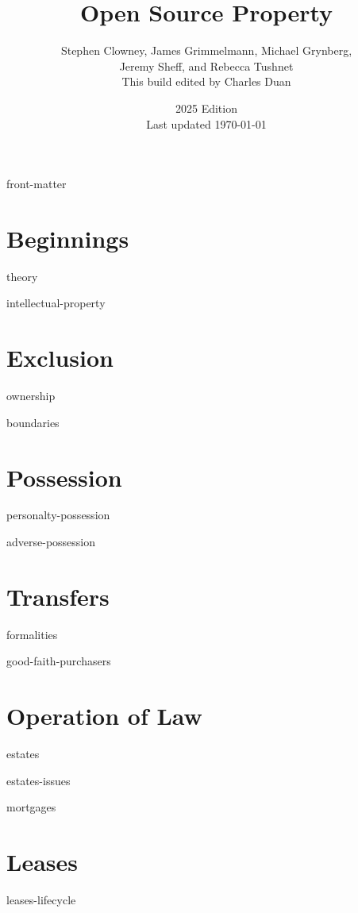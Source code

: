 \documentclass[12pt]{book}
\title{Open Source Property}
\author{Stephen Clowney, James Grimmelmann, Michael Grynberg,\\
Jeremy Sheff, and Rebecca Tushnet \\[12pt]
This build edited by Charles Duan}
\date{2025 Edition \\ Last updated \today}
\begin{document}
\sloppy
\raggedbottom
\frenchspacing
{}                                                
\parskip=0pt                                                  



\makevolume

\tableofcontents

\module front-matter

\mainmatter

\part{Beginnings}

\module theory

\module intellectual-property

\part{Exclusion}

\module ownership

\module boundaries

\part{Possession}

\module personalty-possession

\module adverse-possession


\part{Transfers}

\module formalities

\module good-faith-purchasers



\part{Operation of Law}

\module estates

\module estates-issues

\module mortgages



\part{Leases}

\module leases-lifecycle
\end{document}
